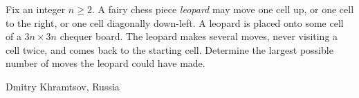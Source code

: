 Fix an integer $n \ge 2$. A fairy chess piece \textit{leopard } may move one cell up, or one cell to the right, or one cell diagonally down-left. A leopard is placed onto some cell of a $3n \times 3n$ chequer board. The leopard makes several moves, never visiting a cell twice, and comes back to the starting cell. Determine the largest possible number of moves the leopard could have made.

Dmitry Khramtsov, Russia